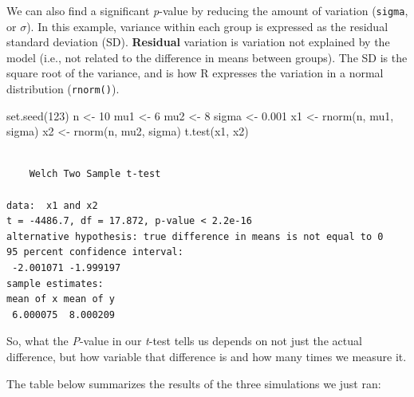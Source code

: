 \documentclass[
  13,
  letterpaper,
]{report}
\newenvironment{Shaded}{\begin{snugshade}}{\end{snugshade}}
\newcommand{\DecValTok}[1]{\textcolor[rgb]{0.68,0.00,0.00}{#1}}
\newcommand{\FloatTok}[1]{\textcolor[rgb]{0.68,0.00,0.00}{#1}}
\newcommand{\FunctionTok}[1]{\textcolor[rgb]{0.28,0.35,0.67}{#1}}
\newcommand{\NormalTok}[1]{\textcolor[rgb]{0.00,0.23,0.31}{#1}}
\newcommand{\OtherTok}[1]{\textcolor[rgb]{0.00,0.23,0.31}{#1}}
\begin{document}
We can also find a significant \emph{p}-value by reducing the amount of
variation (\texttt{sigma}, or \(\sigma\)). In this example, variance
within each group is expressed as the residual standard deviation (SD).
\textbf{Residual} variation is variation not explained by the model
(i.e., not related to the difference in means between groups). The SD is
the square root of the variance, and is how R expresses the variation in
a normal distribution (\texttt{rnorm()}).

\begin{Shaded}
\begin{Highlighting}[]
\FunctionTok{set.seed}\NormalTok{(}\DecValTok{123}\NormalTok{)}
\NormalTok{n }\OtherTok{\textless{}{-}} \DecValTok{10}
\NormalTok{mu1 }\OtherTok{\textless{}{-}} \DecValTok{6}
\NormalTok{mu2 }\OtherTok{\textless{}{-}} \DecValTok{8}
\NormalTok{sigma }\OtherTok{\textless{}{-}} \FloatTok{0.001}
\NormalTok{x1 }\OtherTok{\textless{}{-}} \FunctionTok{rnorm}\NormalTok{(n, mu1, sigma)}
\NormalTok{x2 }\OtherTok{\textless{}{-}} \FunctionTok{rnorm}\NormalTok{(n, mu2, sigma)}
\FunctionTok{t.test}\NormalTok{(x1, x2)}
\end{Highlighting}
\end{Shaded}

\begin{verbatim}

    Welch Two Sample t-test

data:  x1 and x2
t = -4486.7, df = 17.872, p-value < 2.2e-16
alternative hypothesis: true difference in means is not equal to 0
95 percent confidence interval:
 -2.001071 -1.999197
sample estimates:
mean of x mean of y 
 6.000075  8.000209 
\end{verbatim}

So, what the \emph{P}-value in our \emph{t}-test tells us depends on not
just the actual difference, but how variable that difference is and how
many times we measure it.

The table below summarizes the results of the three simulations we just
ran:
\end{document}
